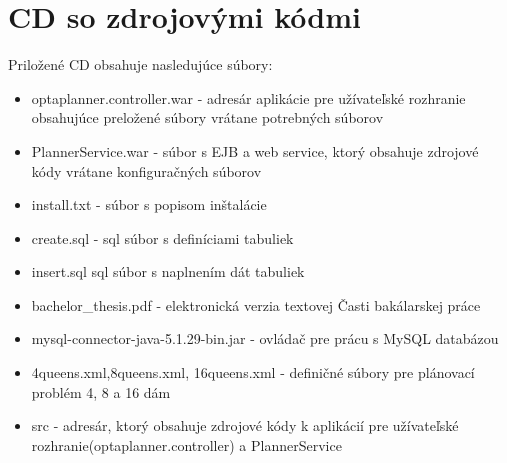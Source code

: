 \chapter{CD so zdrojovými kódmi}
{
	Priložené CD obsahuje nasledujúce súbory:
	\begin{itemize}
	\item optaplanner.controller.war - adresár aplikácie pre užívateľské rozhranie obsahujúce preložené súbory vrátane potrebných súborov
	\item PlannerService.war - súbor s EJB a web service, ktorý obsahuje zdrojové kódy vrátane konfiguračných súborov
	\item install.txt - súbor s popisom inštalácie
	\item create.sql - sql súbor s definíciami tabuliek
	\item insert.sql sql súbor s naplnením dát tabuliek
	\item bachelor\_thesis.pdf - elektronická verzia textovej Časti bakálarskej práce
	\item mysql-connector-java-5.1.29-bin.jar - ovládač pre prácu s MySQL databázou
	\item 4queens.xml,8queens.xml, 16queens.xml - definičné súbory pre plánovací problém 4, 8 a 16 dám
	\item src - adresár, ktorý obsahuje zdrojové kódy k aplikácií pre užívateľské rozhranie(optaplanner.controller) a PlannerService
	\end{itemize}
}
